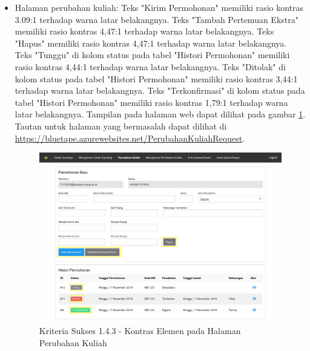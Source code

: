 \documentclass[a4paper,twoside]{article}
\begin{document}
\begin{enumerate}
\begin{itemize}
			\item Halaman perubahan kuliah: Teks "Kirim Permohonan" memiliki rasio kontras 3.09:1 terhadap warna latar belakangnya. Teks "Tambah Pertemuan Ekstra" memiliki rasio kontras 4,47:1 terhadap warna latar belakangnya. Teks "Hapus" memiliki rasio kontras 4,47:1 terhadap warna latar belakangnya. Teks "Tunggu" di kolom status pada tabel "Histori Permohonan" memiliki rasio kontras 4,44:1 terhadap warna latar belakangnya. Teks "Ditolak" di kolom status pada tabel "Histori Permohonan" memiliki rasio kontras 3,44:1 terhadap warna latar belakangnya. Teks "Terkonfirmasi" di kolom status pada tabel "Histori Permohonan" memiliki rasio kontras 1,79:1 terhadap warna latar belakangnya. Tampilan pada halaman web dapat dilihat pada gambar \ref{fig:1.4.3_contrast_minimum_4}. Tautan untuk halaman yang bermasalah dapat dilihat di \url{https://bluetape.azurewebsites.net/PerubahanKuliahRequest}.
			\begin{figure}[H]
				\centering  
				\includegraphics[scale=0.3, frame]{kriteria-sukses-1-4-3-contrast-minimum-4}  
				\caption[Kriteria Sukses 1.4.3 - Kontras Elemen pada Halaman Perubahan Kuliah]{Kriteria Sukses 1.4.3 - Kontras Elemen pada Halaman Perubahan Kuliah}
				\label{fig:1.4.3_contrast_minimum_4}  
			\end{figure} 
			

\end{itemize}
\end{enumerate}
\end{document}
